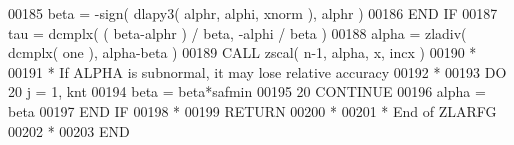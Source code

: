 \begin{DoxyCode}
00185             beta = -sign( dlapy3( alphr, alphi, xnorm ), alphr )
00186 \textcolor{keywordflow}{         END IF}
00187          tau = dcmplx( ( beta-alphr ) / beta, -alphi / beta )
00188          alpha = zladiv( dcmplx( one ), alpha-beta )
00189          \textcolor{keyword}{CALL }zscal( n-1, alpha, x, incx )
00190 \textcolor{comment}{*}
00191 \textcolor{comment}{*        If ALPHA is subnormal, it may lose relative accuracy}
00192 \textcolor{comment}{*}
00193          \textcolor{keywordflow}{DO} 20 j = 1, knt
00194             beta = beta*safmin
00195  20      \textcolor{keywordflow}{CONTINUE}
00196          alpha = beta
00197 \textcolor{keywordflow}{      END IF}
00198 \textcolor{comment}{*}
00199       \textcolor{keywordflow}{RETURN}
00200 \textcolor{comment}{*}
00201 \textcolor{comment}{*     End of ZLARFG}
00202 \textcolor{comment}{*}
00203 \textcolor{keyword}{      END}
\end{DoxyCode}
